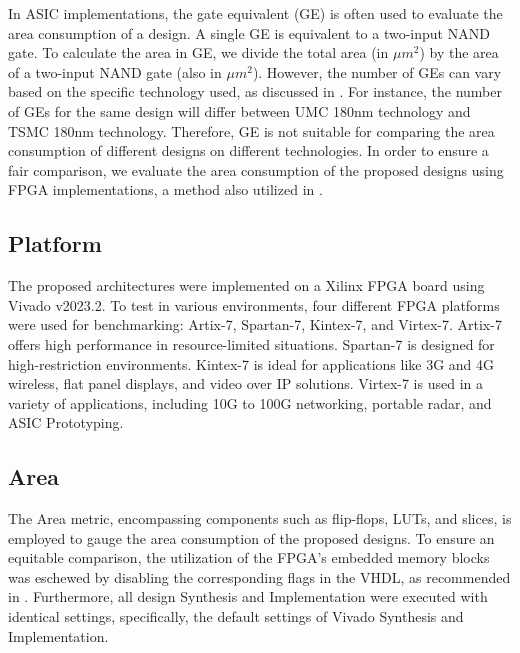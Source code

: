 \documentclass[sn-basic]{sn-jnl}%
\begin{document}
In ASIC implementations, the gate equivalent (GE) is often used to evaluate the area consumption of a design.
A single GE is equivalent to a two-input NAND gate.
To calculate the area in GE, we divide the total area (in $\mu m^2$) by the area of a two-input NAND gate (also in $\mu m^2$).
However, the number of GEs can vary based on the specific technology used, as discussed in \cite{mckay2016report}.
For instance, the number of GEs for the same design will differ between UMC 180nm technology and TSMC 180nm technology.
Therefore, GE is not suitable for comparing the area consumption of different designs on different technologies.
In order to ensure a fair comparison, we evaluate the area consumption of the proposed designs using FPGA implementations, a method also utilized in \cite{mohajerani2020fpga}.

\subsection{Platform}\label{subsec4}

The proposed architectures were implemented on a Xilinx FPGA board using Vivado v2023.2. To test in various environments, four different FPGA platforms were used for benchmarking: Artix-7, Spartan-7, Kintex-7, and Virtex-7.
Artix-7 offers high performance in resource-limited situations. Spartan-7 is designed for high-restriction environments. Kintex-7 is ideal for applications like 3G and 4G wireless, flat panel displays, and video over IP solutions. Virtex-7 is used in a variety of applications, including 10G to 100G networking, portable radar, and ASIC Prototyping.


\subsection{Area}\label{subsec5}

The Area metric, encompassing components such as flip-flops, LUTs, and slices, is employed to gauge the area consumption of the proposed designs.
To ensure an equitable comparison, the utilization of the FPGA's embedded memory blocks was eschewed by disabling the corresponding flags in the VHDL, as recommended in \cite{xilinx2022ultrafast}.
Furthermore, all design Synthesis and Implementation were executed with identical settings, specifically, the default settings of Vivado Synthesis and Implementation.
\end{document}
